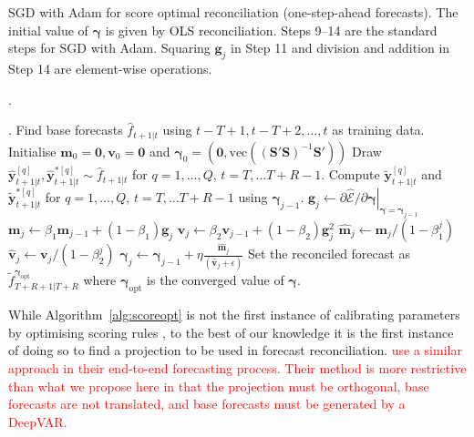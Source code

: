 \documentclass[a4paper,12pt]{article}
\theoremstyle{definition}
\begin{document}
\begin{algorithm}[!htb]
	\caption{SGD with Adam for score optimal reconciliation (one-step-ahead forecasts). The initial value of $\bm{\gamma}$ is given by OLS reconciliation. Steps 9--14 are the standard steps for SGD with Adam. Squaring $\bm{g}_j$ in Step 11 and division and addition in Step 14 are element-wise operations.}\label{alg:scoreopt}.
	\begin{algorithmic}[1]
		{\small
		.
		\State Find base forecasts $\hat{f}_{t+1|t}$ using $t-T+1,t-T+2,\ldots,t$ as training data.
		\EndFor
		\State Initialise $\bm{m}_0=\bm{0}, \bm{v}_0=\bm{0}$ and $\bm{\gamma}_0=\left(\bm{0},\text{vec}\left((\bm{S}'\bm{S})^{-1}\bm{S}'\right)\right)$
		\State Draw ${\hat{\bm{y}}}^{[q]}_{t+1|t},{\hat{\bm{y}}}^{*[q]}_{t+1|t}\sim \hat{f}_{t+1|t}$ for $q=1,\ldots,Q$, $t=T,\ldots T+R-1$.
		\State Compute $\tilde{\bm{y}}^{[q]}_{t+1|t}$ and $\tilde{\bm{y}}^{*[q]}_{t+1|t}$ for $q=1,\ldots,Q$, $t=T,\ldots T+R-1$ using $\bm{\gamma}_{j-1}$.
		\State $\bm{g}_j \gets \left.\partial\hat{\mathcal{E}}/\partial{\bm{\gamma}}\right|_{\bm{\gamma}=\bm{\gamma}_{j-1}}$ 
		\State $\bm{m}_j\gets\beta_1\bm{m}_{j-1}+(1-\beta_1)\bm{g}_j$ 
		\State $\bm{v}_j\gets\beta_2\bm{v}_{j-1}+(1-\beta_2)\bm{g}^2_j$ 
		\State $\hat{\bm{m}}_j\gets \bm{m}_j/(1-\beta_1^j)$ 
		\State $\hat{\bm{v}}_j\gets \bm{v}_j/(1-\beta_2^j)$ 
		\State $\bm{\gamma}_j\gets\bm{\gamma}_{j-1}+\eta\frac{\hat{\bm{m}}_j}{(\hat{\bm{v}}_j+\epsilon)}$ 
		\EndFor
		\State Set the reconciled forecast as $\tilde{f}^{\bm{\gamma}_{\text{opt}}}_{T+R+1|T+R}$ where $\bm{\gamma}_{\text{opt}}$ is the converged value of $\bm{\gamma}$.
		\EndProcedure
	}
	\end{algorithmic}
\end{algorithm}

While Algorithm~\ref{alg:scoreopt} is not the first instance of calibrating parameters by optimising scoring rules \citep[see][for an earlier example]{gneiting2005}, to the best of our knowledge it is the first instance of doing so to find a projection to be used in forecast reconciliation. \textcolor{red}{\cite{RanEtAl2021} use a similar approach in their end-to-end forecasting process. Their method is more restrictive than what we propose here in that the projection must be orthogonal, base forecasts are not translated, and base forecasts must be generated by a DeepVAR.}
\end{document}

